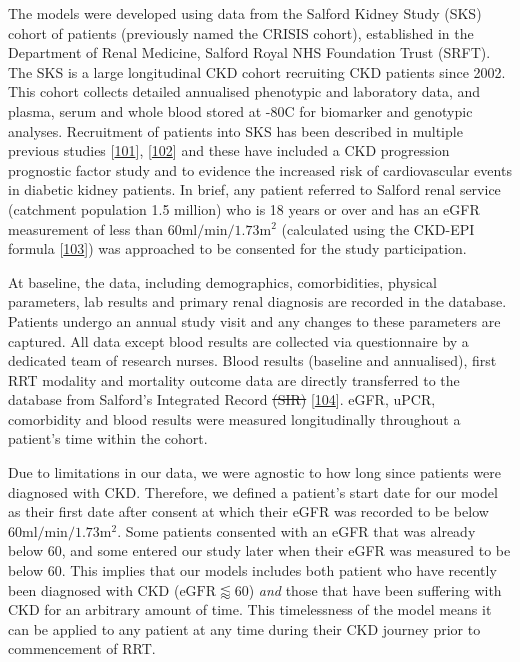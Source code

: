 \documentclass[12pt,PhD,twoside,openright]{muthesis}
\begin{document}
The models were developed using data from the Salford Kidney Study (SKS) cohort of patients (previously named the CRISIS cohort), established in the Department of Renal Medicine, Salford Royal NHS Foundation Trust (SRFT). The SKS is a large longitudinal CKD cohort recruiting CKD patients since 2002. This cohort collects detailed annualised phenotypic and laboratory data, and plasma, serum and whole blood stored at -80\textdegree C for biomarker and genotypic analyses. Recruitment of patients into SKS has been described in multiple previous studies {[}\protect\hyperlink{ref-hoefield_factors_2010}{101}{]}, {[}\protect\hyperlink{ref-chinnadurai_increased_2019-1}{102}{]} and these have included a CKD progression prognostic factor study and to evidence the increased risk of cardiovascular events in diabetic kidney patients. In brief, any patient referred to Salford renal service (catchment population 1.5 million) who is 18 years or over and has an eGFR measurement of less than \(60\textrm{ml}/\textrm{min}/1.73\textrm{m}^2\) (calculated using the CKD-EPI formula {[}\protect\hyperlink{ref-levey_new_2009}{103}{]}) was approached to be consented for the study participation.

At baseline, the data, including demographics, comorbidities, physical parameters, lab results and primary renal diagnosis are recorded in the database. Patients undergo an annual study visit and any changes to these parameters are captured. All data except blood results are collected via questionnaire by a dedicated team of research nurses. Blood results (baseline and annualised), first RRT modality and mortality outcome data are directly transferred to the database from Salford's Integrated Record \sout{(SIR)} {[}\protect\hyperlink{ref-new_obtaining_2014}{104}{]}. eGFR, uPCR, comorbidity and blood results were measured longitudinally throughout a patient's time within the cohort.

Due to limitations in our data, we were agnostic to how long since patients were diagnosed with CKD. Therefore, we defined a patient's start date for our model as their first date after consent at which their eGFR was recorded to be below \(60\textrm{ml}/\textrm{min}/1.73\textrm{m}^2\). Some patients consented with an eGFR that was already below 60, and some entered our study later when their eGFR was measured to be below 60. This implies that our models includes both patient who have recently been diagnosed with CKD (\(\textrm{eGFR} \lessapprox 60\)) \emph{and} those that have been suffering with CKD for an arbitrary amount of time. This timelessness of the model means it can be applied to any patient at any time during their CKD journey prior to commencement of RRT.
\end{document}
